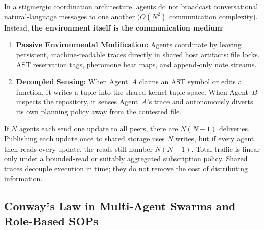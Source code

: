 %
In a stigmergic coordination architecture, agents do not broadcast conversational natural-language messages to one another ($O(N^2)$ communication complexity). Instead, \textbf{the environment itself is the communication medium}:
\begin{enumerate}[leftmargin=1.8em,itemsep=2pt]
  \item \textbf{Passive Environmental Modification:} Agents coordinate by leaving persistent, machine-readable traces directly in shared host artifacts: file locks, AST reservation tags, pheromone heat maps, and append-only note streams.
  \item \textbf{Decoupled Sensing:} When Agent~$A$ claims an AST symbol or edits a function, it writes a tuple into the shared kernel tuple space. When Agent~$B$ inspects the repository, it senses Agent~$A$'s trace and autonomously diverts its own planning policy away from the contested file.
\end{enumerate}

If $N$ agents each send one update to all peers, there are $N(N-1)$ deliveries. Publishing each update once to shared storage uses $N$ writes, but if every agent then reads every update, the reads still number $N(N-1)$. Total traffic is linear only under a bounded-read or suitably aggregated subscription policy. Shared traces decouple execution in time; they do not remove the cost of distributing information.

\subsection{Conway's Law in Multi-Agent Swarms and Role-Based SOPs}

